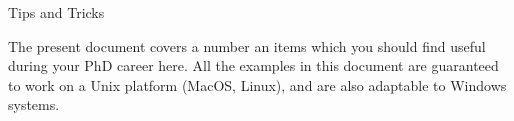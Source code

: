 \documentclass{report}
\makeatletter
\newcommand*{\toccontents}{\@starttoc{toc}}
\makeatother
\begin{document}
\begin{huge}
\begin{center}
Tips and Tricks
\end{center}
\end{huge}
The present document covers a number an items which you should find useful during your PhD career here. All the examples in this document are guaranteed to work on a Unix platform (MacOS, Linux), and are also adaptable to Windows systems.\\
\toccontents



%
\end{document}
